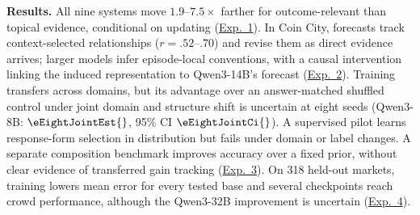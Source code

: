 \noindent\textbf{Results.}
All nine systems move $1.9$--$7.5\times$ farther for outcome-relevant than topical
evidence, conditional on updating (\hyperref[sec:exp1]{Exp.~1}). In Coin City,
forecasts track context-selected relationships ($r=.52$--$.70$) and revise them
as direct evidence arrives; larger models infer episode-local conventions, with
a causal intervention linking the induced representation to Qwen3-14B's forecast
(\hyperref[sec:exp2]{Exp.~2}). Training transfers across domains, but its
advantage over an answer-matched shuffled control under joint domain and structure
shift is uncertain at eight seeds (Qwen3-8B:
$\eEightJointEst{}$, 95\% CI $\eEightJointCi{}$). A supervised pilot learns response-form selection in distribution but fails
under domain or label changes. A separate composition benchmark improves
accuracy over a fixed prior, without clear evidence of transferred gain tracking
(\hyperref[sec:exp3]{Exp.~3}). On 318 held-out markets, training lowers mean
error for every tested base and several checkpoints reach crowd performance,
although the Qwen3-32B improvement is uncertain
(\hyperref[sec:exp4]{Exp.~4}).
